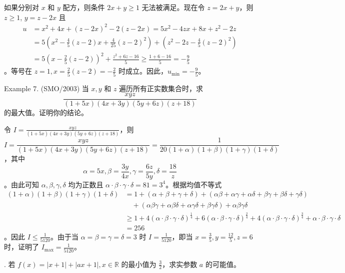 \begin{questions}
\begin{solution}
如果分别对 $x$ 和 $y$ 配方，则条件 $2x + y \ge 1$ 无法被满足。现在令 $z = 2x + y$，则 $z \ge 1$, $y = z - 2x$ 且
\begin{align*}
u &= x^2 + 4x + (z - 2x)^2 - 2(z - 2x) = 5x^2 - 4zx + 8x + z^2 - 2z \\
&= 5\left(x^2 - \frac{4}{5}(z - 2)x + \frac{4}{25}(z - 2)^2\right) + \left(z^2 - 2z - \frac{4}{5}(z - 2)^2\right) \\
&= 5\left(x - \frac{2}{5}(z - 2)\right)^2 + \frac{z^2 + 6z - 16}{5} \ge \frac{1 + 6 - 16}{5} = -\frac{9}{5}
\end{align*}
。等号在 $z = 1, x = \frac{2}{5}(z - 2) = -\frac{2}{5}$ 时成立。因此，$u_{\min} = -\frac{9}{5}$。
\end{solution}

\question Example 7. (SMO/2003) 当 $x, y$ 和 $z$ 遍历所有正实数集合时，求
\[
\frac{xyz}{(1 + 5x)(4x + 3y)(5y + 6z)(z + 18)}
\]
的最大值。证明你的结论。

\begin{solution}
令 $I = \frac{xyz}{(1 + 5x)(4x + 3y)(5y + 6z)(z + 18)}$，则
\[
I = \frac{xyz}{(1 + 5x)(4x + 3y)(5y + 6z)(z + 18)} = \frac{1}{20(1 + \alpha)(1 + \beta)(1 + \gamma)(1 + \delta)}
\]
，其中
\[
\alpha = 5x, \beta = \frac{3y}{4x}, \gamma = \frac{6z}{5y}, \delta = \frac{18}{z}
\]
。由此可知 $\alpha, \beta, \gamma, \delta$ 均为正数且 $\alpha \cdot \beta \cdot \gamma \cdot \delta = 81 = 3^4$。根据均值不等式
\begin{align*}
(1 + \alpha)(1 + \beta)(1 + \gamma)(1 + \delta) &= 1 + (\alpha + \beta + \gamma + \delta) + (\alpha\beta + \alpha\gamma + \alpha\delta + \beta\gamma + \beta\delta + \gamma\delta) \\
&\quad + (\alpha\beta\gamma + \alpha\beta\delta + \alpha\gamma\delta + \beta\gamma\delta) + \alpha\beta\gamma\delta \\
&\ge 1 + 4(\alpha \cdot \beta \cdot \gamma \cdot \delta)^{\frac{1}{4}} + 6(\alpha \cdot \beta \cdot \gamma \cdot \delta)^{\frac{2}{4}} + 4(\alpha \cdot \beta \cdot \gamma \cdot \delta)^{\frac{3}{4}} + \alpha \cdot \beta \cdot \gamma \cdot \delta \\
&= 256
\end{align*}
。因此 $I \le \frac{1}{5120}$。由于当 $\alpha = \beta = \gamma = \delta = 3$ 时 $I = \frac{1}{5120}$，即当 $x = \frac{3}{5}, y = \frac{12}{5}, z = 6$ 时，证明了 $I_{\max} = \frac{1}{5120}$。
\end{solution}

. 若 $f(x) = |x + 1| + |ax + 1|, x \in \mathbb{R}$ 的最小值为 $\frac{3}{2}$，求实参数 $a$ 的可能值。


\end{questions}
